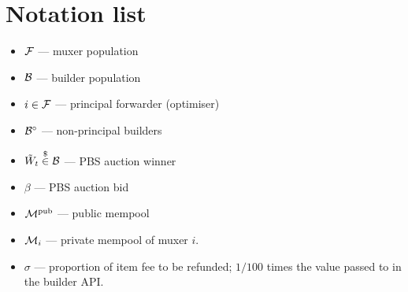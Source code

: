 \appendix

\section*{Notation list}

\begin{itemize}
\item $\mathcal{F}$ — muxer population
\item $\mathcal{B}$ — builder population
\item $i\in\mathcal{F}$ — principal forwarder (optimiser)
\item $\mathcal{B}^\circ$ — non-principal builders
\item $\tilde{W}_t \stackrel{\$}{\in} \mathcal{B}$ — PBS auction winner 
\item $\beta$ — PBS auction bid
\item $\mathcal{M}^\mathrm{pub}$ — public mempool
\item $\mathcal{M}_i$ — private mempool of muxer $i$.
\item $\sigma$ — proportion of item fee to be refunded; $1/100$ times the value passed to  in the builder API.
\end{itemize} 

\printbibliography